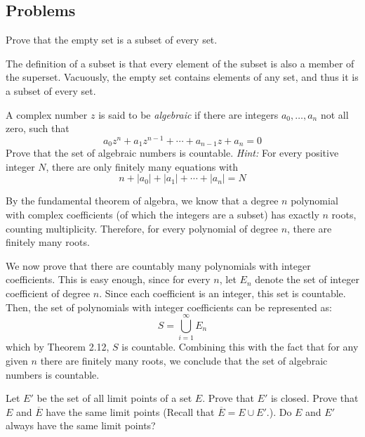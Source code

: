 \documentclass[10pt]{article}
\begin{document}
	\subsection{Problems}
	\begin{problem}
		Prove that the empty set is a subset of every set. 
	\end{problem}

	\begin{solution}
		The definition of a subset is that every element of the subset is also a member of the superset. 
		Vacuously, the empty set contains elements of any set, and thus it is a subset of every set.  
	\end{solution}

	\begin{problem}
		A complex number \( z \) is said to be \textit{algebraic} if there are integers \( a_0, \dots, a_n \) not 
		all zero, such that
		 \[
		a_0z^{n} + a_1z^{n - 1} + \cdots + a_{n-1}z + a_n = 0
		\] 
		Prove that the set of algebraic numbers is countable. \textit{Hint:} For every positive 
		integer \( N \), there are only finitely many equations with 
		\[
		n + |a_0| + |a_1| + \cdots + |a_n| = N
		\] 
	\end{problem}

	\begin{solution}
		By the fundamental theorem of algebra, we know that a degree \( n \) polynomial with complex 
		coefficients (of which the integers are a subset) has exactly \( n \) roots, counting multiplicity. 
		Therefore, for every polynomial of degree \( n \), there are finitely many roots. 

		We now prove that there are countably many polynomials with integer coefficients. This is easy enough, 
		since for every \( n \), let \( E_n \) denote the set of integer coefficient of degree \( n \). Since 
		each coefficient is an integer, this set is countable. Then, the set of polynomials with integer coefficients 
		can be represented as:
		\[
		S = \bigcup_{i = 1}^{\infty}E_n
		\] 
		which by Theorem 2.12, \( S \) is countable. Combining this with the fact that for any given \( n \) there are
		finitely many roots, we conclude that the set of algebraic numbers is countable.  

	\end{solution}

	\begin{problem}
		Let \( E' \) be the set of all limit points of a set \( E \). Prove that \( E' \) is closed. Prove that 
		\( E \) and \( \overline E \) have the same limit points (Recall that \( \overline E = E \cup E'. \)). 
		Do \( E \) and \( E' \) always have the same limit points? 
	\end{problem}
\end{document}

